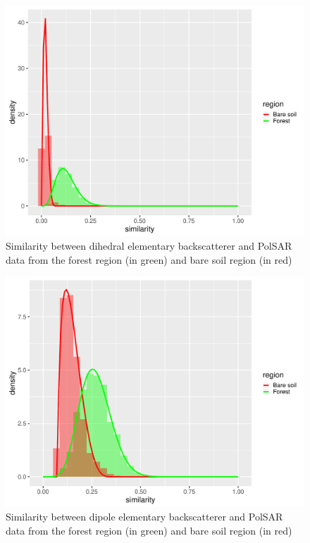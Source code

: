 \documentclass[conference]{IEEEtran}
\begin{document}
\begin{figure}[!ht]
    \centering
    \includegraphics[width = .9\linewidth, height = .7\linewidth]{../../../Figures/paper_19_05/di.pdf}
    \caption{Similarity between dihedral elementary backscatterer and PolSAR data from the forest region (in green) and bare soil region (in red)}
    \label{fig:di}
\end{figure}

\begin{figure}[!ht]
    \centering
    \includegraphics[width = .9\linewidth, height = .7\linewidth]{../../../Figures/paper_19_05/dip.pdf}
    \caption{Similarity between dipole elementary backscatterer and PolSAR data from the forest region (in green) and bare soil region (in red)}
    \label{fig:dip}
\end{figure}
\end{document}
